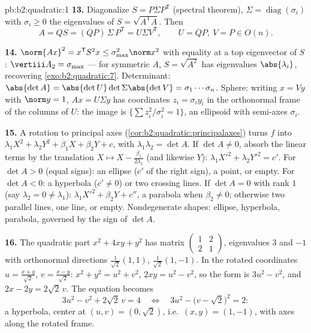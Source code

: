 \begin{solution}{pb:b2:quadratic:1}
\textbf{13.} Diagonalize $S = P\Sigma P^{\mathsf T}$ (spectral
theorem), $\Sigma = \operatorname{diag}(\sigma_i)$ with
$\sigma_i \geq 0$ the eigenvalues of $S =
\sqrt{A^{\mathsf T}A}$. Then
\[
A = QS = (QP)\,\Sigma\,P^{\mathsf T} = U\Sigma V^{\mathsf T},
\qquad U = QP,\ V = P \in O(n) .
\]

\textbf{14.} $\norm{Ax}^2 = x^{\mathsf T}S^2x \leq
\sigma_{\max}^2\norm x^2$ with equality at a top eigenvector of
$S$: $\vertiii A_2 = \sigma_{\max}$ --- for symmetric $A$,
$S = \sqrt{A^2}$ has eigenvalues $\abs{\lambda_i}$, recovering
\cref{exo:b2:quadratic:7}. Determinant: $\abs{\det A} =
\abs{\det U}\det\Sigma\abs{\det V} = \sigma_1\cdots\sigma_n$.
Sphere: writing $x = Vy$ with $\norm y = 1$, $Ax = U\Sigma y$
has coordinates $z_i = \sigma_iy_i$ in the orthonormal frame of
the columns of $U$: the image is $\{\sum z_i^2/\sigma_i^2 =
1\}$, an ellipsoid with semi-axes $\sigma_i$.

\textbf{15.} A rotation to principal axes
(\cref{cor:b2:quadratic:principalaxes}) turns $f$ into
$\lambda_1X^2 + \lambda_2Y^2 + \beta_1X + \beta_2Y + c$, with
$\lambda_1\lambda_2 = \det A$. If $\det A \neq 0$, absorb the
linear terms by the translation $X \mapsto X -
\frac{\beta_1}{2\lambda_1}$ (and likewise $Y$): $\lambda_1X'^2
+ \lambda_2Y'^2 = c'$. For $\det A > 0$ (equal signs): an
ellipse ($c'$ of the right sign), a point, or empty. For $\det
A < 0$: a hyperbola ($c' \neq 0$) or two crossing lines. If
$\det A = 0$ with rank $1$ (say $\lambda_2 = 0 \neq
\lambda_1$): $\lambda_1X'^2 + \beta_2Y + c''$, a parabola when
$\beta_2 \neq 0$; otherwise two parallel lines, one line, or
empty. Nondegenerate shapes: ellipse, hyperbola, parabola,
governed by the sign of $\det A$.

\textbf{16.} The quadratic part $x^2 + 4xy + y^2$ has matrix
$\begin{pmatrix}1 & 2\\ 2 & 1\end{pmatrix}$, eigenvalues $3$
and $-1$ with orthonormal directions $\frac{1}{\sqrt2}(1,1)$,
$\frac{1}{\sqrt2}(1,-1)$. In the rotated coordinates $u =
\frac{x+y}{\sqrt2}$, $v = \frac{x-y}{\sqrt2}$: $x^2 + y^2 = u^2
+ v^2$, $2xy = u^2 - v^2$, so the form is $3u^2 - v^2$, and $2x
- 2y = 2\sqrt2\,v$. The equation becomes
\[
3u^2 - v^2 + 2\sqrt2\,v = 4
\quad\Longleftrightarrow\quad
3u^2 - \bigl(v - \sqrt2\bigr)^2 = 2 :
\]
a hyperbola, center at $(u, v) = (0, \sqrt2)$, i.e.\ $(x, y) =
(1, -1)$, with axes along the rotated frame.


\end{solution}
